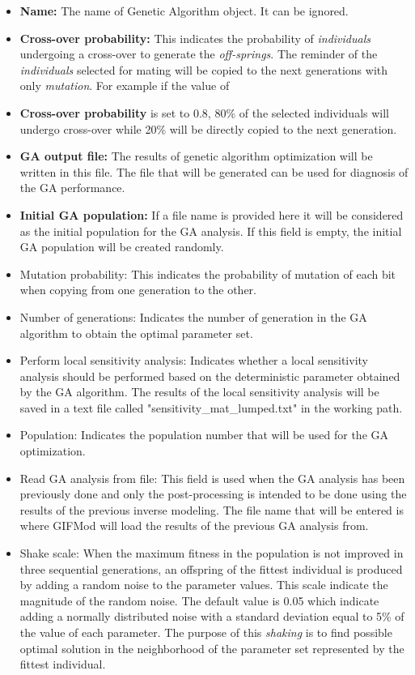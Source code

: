 \begin{itemize}
    \item \textbf{Name: } The name of Genetic Algorithm object. It can be ignored. 
    \item \textbf{Cross-over probability: } This indicates the probability of \textit{individuals} undergoing a cross-over to generate the \textit{off-springs}. The reminder of the \textit{individuals} selected for mating will be copied to the next generations with only \textit{mutation}. For example if the value of \item \textbf{Cross-over probability} is set to 0.8, 80\% of the selected individuals will undergo cross-over while 20\% will be directly copied to the next generation. 
    \item \textbf{GA output file: } The results of genetic algorithm optimization will be written in this file. The file that will be generated can be used for diagnosis of the GA performance. 
    \item \textbf{Initial GA population: } If a file name is provided here it will be considered as the initial population for the GA analysis. If this field is empty, the initial GA population will be created randomly. 
    \item{Mutation probability: } This indicates the probability of mutation of each bit when copying from one generation to the other.
    \item{Number of generations: } Indicates the number of generation in the GA algorithm to obtain the optimal parameter set.
    \item{Perform local sensitivity analysis: } Indicates whether a local sensitivity analysis should be performed based on the deterministic parameter obtained by the GA algorithm. The results of the local sensitivity analysis will be saved in a text file called "sensitivity\_mat\_lumped.txt" in the working path. 
    \item{Population: } Indicates the population number that will be used for the GA optimization.
    \item{Read GA analysis from file: } This field is used when the GA analysis has been previously done and only the post-processing is intended to be done using the results of the previous inverse modeling. The file name that will be entered is where GIFMod will load the results of the previous GA analysis from.
    \item{Shake scale: } When the maximum fitness in the population is not improved in three sequential generations, an offspring of the fittest individual is produced by adding a random noise to the parameter values. This scale indicate the magnitude of the random noise. The default value is 0.05 which indicate adding a normally distributed noise with a standard deviation equal to 5\% of the value of each parameter. The purpose of this \textit{shaking} is to find possible optimal solution in the neighborhood of the parameter set represented by the fittest individual. 

\end{itemize}
